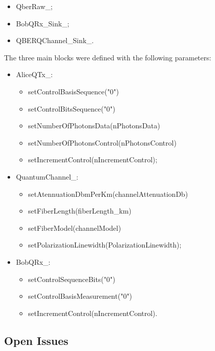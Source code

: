 \begin{refsection}
\begin{itemize}
  \item QberRaw\_;
  
  \item BobQRx\_Sink\_;
  
  \item QBERQChannel\_Sink\_.
\end{itemize}

The three main blocks were defined with the following parameters:

\begin{itemize}
  \item AliceQTx\_:
    \begin{itemize}
      \item setControlBasisSequence("0")
      \item setControlBitsSequence("0")
      \item setNumberOfPhotonsData(nPhotonsData)
      \item setNumberOfPhotonsControl(nPhotonsControl)
      \item setIncrementControl(nIncrementControl);
    \end{itemize}
    
  \item QuantumChannel\_:
    \begin{itemize}
      \item setAtennuationDbmPerKm(channelAttenuationDb)
      \item setFiberLength(fiberLength\_km)
      \item setFiberModel(channelModel)
      \item setPolarizationLinewidth(PolarizationLinewidth);
    \end{itemize}
    
  \item BobQRx\_:
    \begin{itemize}
      \item setControlSequenceBits("0")
      \item setControlBasisMeasurement("0")
      \item setIncrementControl(nIncrementControl).
    \end{itemize}
\end{itemize}

\subsection{Open Issues}


\clearpage
\printbibliography[heading=subbibliography]
\end{refsection}
\cleardoublepage
